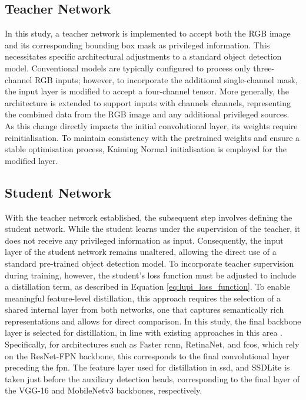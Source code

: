 \subsection{Teacher Network}
\label{subsec:4_teacher}

In this study, a teacher network is implemented to accept both the RGB image and its corresponding bounding box mask as privileged information. This necessitates specific architectural adjustments to a standard object detection model. Conventional models are typically configured to process only three-channel RGB inputs; however, to incorporate the additional single-channel mask, the input layer is modified to accept a four-channel tensor. More generally, the architecture is extended to support inputs with \gls{channels} channels, representing the combined data from the RGB image and any additional privileged sources. As this change directly impacts the initial convolutional layer, its weights require reinitialisation. To maintain consistency with the pretrained weights and ensure a stable optimisation process, Kaiming Normal initialisation \cite{kaiming} is employed for the modified layer.

\subsection{Student Network}
\label{subsec:4_student}

With the teacher network established, the subsequent step involves defining the student network. While the student learns under the supervision of the teacher, it does not receive any privileged information as input. Consequently, the input layer of the student network remains unaltered, allowing the direct use of a standard pre-trained object detection model. To incorporate teacher supervision during training, however, the student’s loss function must be adjusted to include a distillation term, as described in Equation \ref{eq:lupi_loss_function}. To enable meaningful feature-level distillation, this approach requires the selection of a shared internal layer from both networks, one that captures semantically rich representations and allows for direct comparison. In this study, the final backbone layer is selected for distillation, in line with existing approaches in this area \cite{lab2wild, lupi_distillation, distillation2}. Specifically, for architectures such as Faster \gls{rcnn}, RetinaNet, and \gls{fcos}, which rely on the ResNet-FPN backbone, this corresponds to the final convolutional layer preceding the \gls{fpn}. The feature layer used for distillation in \gls{ssd}, and SSDLite is taken just before the auxiliary detection heads, corresponding to the final layer of the VGG-16 and MobileNetv3 backbones, respectively.

